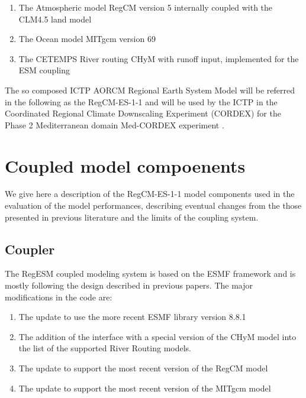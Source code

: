 \documentclass[journal abbreviation, manuscript]{copernicus}
\begin{document}
\begin{enumerate}
    \item The Atmospheric model RegCM version 5 \citep{giorgi-2023}
        internally coupled with the CLM4.5 land model \citep{oleson-2013}
    \item The Ocean model MITgcm version 69 \citep{marshall-1997,adcroft-2004}
    \item The CETEMPS River routing CHyM with runoff input, implemented
        for the ESM coupling \citep{coppola-2007}
\end{enumerate}

The so composed ICTP AORCM Regional Earth System Model will be referred in the
following as the RegCM-ES-1-1 and will be used by the ICTP in
the Coordinated Regional Climate Downscaling Experiment (CORDEX) for the
Phase 2 Mediterranean domain Med-CORDEX experiment \citep{somot-2020}.

\section{Coupled model compoenents}

We give here a description of the RegCM-ES-1-1 model components used in the
evaluation of the model performances, describing eventual changes from the
those presented in previous literature and the limits of the coupling
system.

\subsection{Coupler}

The RegESM coupled modeling system is based on the ESMF framework and is
mostly following the design described in previous papers. The major
modifications in the code are:

\begin{enumerate}
    \item The update to use the more recent ESMF library version 8.8.1
    \item The addition of the interface with a special version of the CHyM
        model into the list of the supported River Routing models.
    \item The update to support the most recent version of the RegCM model
    \item The update to support the most recent version of the MITgcm model
\end{enumerate}
\end{document}
